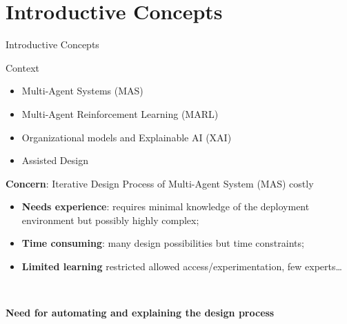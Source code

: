 

	\section{Introductive Concepts}
	\begin{frame}{Introductive Concepts}

        \begin{block}{Context}

            \begin{itemize}
                \item Multi-Agent Systems (MAS)
                \item Multi-Agent Reinforcement Learning (MARL)
                \item Organizational models and Explainable AI (XAI)
                \item Assisted Design
            \end{itemize}

        \end{block}

        \begin{alertblock}{\textbf{Concern}: Iterative Design Process of Multi-Agent System (MAS) costly}

            \begin{itemize}
                \item \textbf{Needs experience}: requires minimal knowledge of the deployment environment but possibly highly complex;
                \item \textbf{Time consuming}: many design possibilities but time constraints;
                \item \textbf{Limited learning} restricted allowed access/experimentation, few experts\dots
            \end{itemize}

        \

        \textbf{Need for automating and explaining the design process}

        \end{alertblock}
 
	\end{frame}